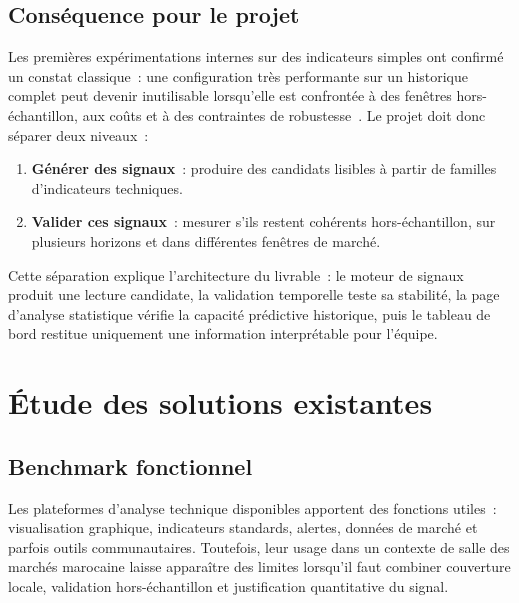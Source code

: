 \subsection{Conséquence pour le projet}

Les premières expérimentations internes sur des indicateurs simples ont confirmé un
constat classique~: une configuration très performante sur un historique complet peut
devenir inutilisable lorsqu'elle est confrontée à des fenêtres hors-échantillon, aux coûts
et à des contraintes de robustesse~\cite{rapport_s3}. Le projet doit donc séparer deux
niveaux~:

\begin{enumerate}
    \item \textbf{Générer des signaux}~: produire des candidats lisibles à partir de
    familles d'indicateurs techniques.
    \item \textbf{Valider ces signaux}~: mesurer s'ils restent cohérents hors-échantillon,
    sur plusieurs horizons et dans différentes fenêtres de marché.
\end{enumerate}

Cette séparation explique l'architecture du livrable~: le moteur de signaux produit une
lecture candidate, la validation temporelle teste sa stabilité, la page d'analyse
statistique vérifie la capacité prédictive historique, puis le tableau de bord restitue
uniquement une information interprétable pour l'équipe.

\section{Étude des solutions existantes}
\label{sec:existant}

\subsection{Benchmark fonctionnel}

Les plateformes d'analyse technique disponibles apportent des fonctions utiles~:
visualisation graphique, indicateurs standards, alertes, données de marché et parfois
outils communautaires. Toutefois, leur usage dans un contexte de salle des marchés marocaine laisse
apparaître des limites lorsqu'il faut combiner couverture locale, validation
hors-échantillon et justification quantitative du signal.

